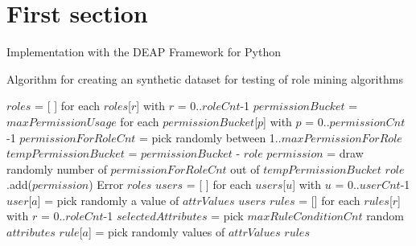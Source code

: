 \newpage
\section{First section}
    
Implementation with the DEAP Framework for Python \cite{DeRainville:2012}

\begin{algorithm}
\caption{Algorithm for creating an synthetic dataset for testing of role mining algorithms}
\label{alg:CreateDataSet}
\begin{algorithmic}[1]
    \State $roles$ = [ ] for each $roles$[$r$] with $r$ = 0..$roleCnt$-1
    \State $permissionBucket$ = $maxPermissionUsage$ for each $permissionBucket$[$p$] with $p$ = 0..$permissionCnt$-1
        \State $permissionForRoleCnt$ = pick randomly between 1..$maxPermissionForRole$
        \State $tempPermissionBucket$ = $permissionBucket$ - $role$
            \State $permission$ = draw randomly number of $permissionForRoleCnt$ out of $tempPermissionBucket$
            \State $role$.add($permission$)
        \Else
            \State Error
        \EndIf
    \EndFor
    \State \Return $roles$
\EndProcedure
\State
{}
    \State $users$ = [ ] for each $users$[$u$] with $u$ = 0..$userCnt$-1
            \State $user$[$a$] = pick randomly a value of $attrValues$
        \EndFor
    \EndFor
    \State \Return $users$
\EndProcedure
\State
{}
    \State $rules$ = [{}] for each $rules$[$r$] with $r$ = 0..$roleCnt$-1
        \State $selectedAttributes$ = pick $maxRuleConditionCnt$ random $attributes$
            \State $rule$[$a$] = pick randomly values of $attrValues$
        \EndFor
    \EndFor
    \State \Return $rules$
\EndProcedure
\end{algorithmic}
\end{algorithm}
